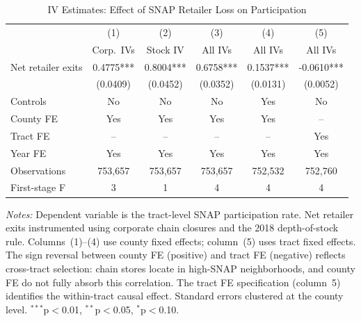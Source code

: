 \begin{table}[t]
\centering
\caption{IV Estimates: Effect of SNAP Retailer Loss on Participation}
\label{tab:iv}
\begin{threeparttable}
\begin{tabular}{lccccc}
\toprule
& (1) & (2) & (3) & (4) & (5) \\
& Corp.\ IVs & Stock IV & All IVs & All IVs & All IVs \\
\midrule
Net retailer exits & 0.4775*** & 0.8004*** & 0.6758*** & 0.1537*** & -0.0610*** \\
& (0.0409) & (0.0452) & (0.0352) & (0.0131) & (0.0052) \\
\midrule
Controls & No & No & No & Yes & No \\
County FE & Yes & Yes & Yes & Yes & -- \\
Tract FE & -- & -- & -- & -- & Yes \\
Year FE & Yes & Yes & Yes & Yes & Yes \\
\midrule
Observations & 753,657 & 753,657 & 753,657 & 752,532 & 752,760 \\
First-stage F & 3 & 1 & 4 & 4 & 4 \\
\bottomrule
\end{tabular}
\begin{tablenotes}
\small
\item \textit{Notes:} Dependent variable is the tract-level SNAP participation rate. Net retailer exits instrumented using corporate chain closures and the 2018 depth-of-stock rule. Columns~(1)--(4) use county fixed effects; column~(5) uses tract fixed effects. The sign reversal between county FE (positive) and tract FE (negative) reflects cross-tract selection: chain stores locate in high-SNAP neighborhoods, and county FE do not fully absorb this correlation. The tract FE specification (column~5) identifies the within-tract causal effect. Standard errors clustered at the county level. $^{***}$p$<$0.01, $^{**}$p$<$0.05, $^{*}$p$<$0.10.
\end{tablenotes}
\end{threeparttable}
\end{table}
